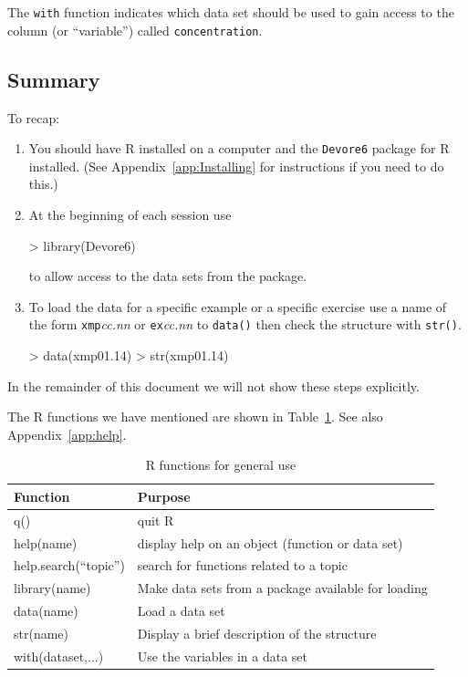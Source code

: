 \documentclass{book}
\begin{document}
The \texttt{with} function indicates which data set should be used to
gain access to the column (or ``variable'') called \texttt{concentration}.

\subsection*{Summary}
\label{sec:prelim:summary}

To recap:
\begin{enumerate}
\item You should have R installed on a computer and the
  \texttt{Devore6} package for R installed.  (See
  Appendix~\ref{app:Installing} for instructions if you need to do
  this.)

\item At the beginning of each session use
\begin{Schunk}
\begin{Sinput}
> library(Devore6)
\end{Sinput}
\end{Schunk}
to allow access to the data sets from the package.
\item To load the data for a specific example or a specific exercise
  use a name of the form \texttt{xmp}\textit{cc.nn} or
  \texttt{ex}\textit{cc.nn} to \texttt{data()} then check the
  structure with \texttt{str()}.
\begin{Schunk}
\begin{Sinput}
> data(xmp01.14)
> str(xmp01.14)
\end{Sinput}
\end{Schunk}
\end{enumerate}
In the remainder of this document we will not show these steps
explicitly.

The R functions we have mentioned are shown in Table~\ref{tab:general}.  See also Appendix~\ref{app:help}.

\begin{table}[htbp]
  \centering
  \begin{tabular}[]{l l}
    Function & Purpose \\\hline
    q()         & quit R\\
    help(name)  & display help on an object (function or data set)\\
    help.search(``topic'')& search for functions related to a topic\\
    library(name)  & Make data sets from a package available for loading\\
    data(name)     & Load a data set \\
    str(name)      & Display a brief description of the structure \\
    with(dataset,$\dots$)  & Use the variables in a data set \\
    \hline
  \end{tabular}
  \caption{R functions for general use}
  \label{tab:general}
\end{table}
\end{document}
